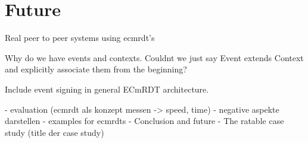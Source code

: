 \documentclass[
	ngerman,
	ruledheaders=section,   %
	class=report,		    %
	thesis={type=bachelor}, %
	accentcolor=9c,			%
	custommargins=true,    %
	marginpar=false,        %
	parskip=half-,          %
	fontsize=11pt,          %
]{tudapub}
\begin{document}
\chapter{Future}
Real peer to peer systems using ecmrdt's

Why do we have events and contexts. Couldnt we just say Event extends Context and explicitly associate them from the beginning?

Include event signing in general ECmRDT architecture.

- evaluation (ecmrdt als konzept messen -> speed, time)
- negative aspekte darstellen
- examples for ecmrdts
- Conclusion and future
- The ratable case study (title der case study)
\end{document}

